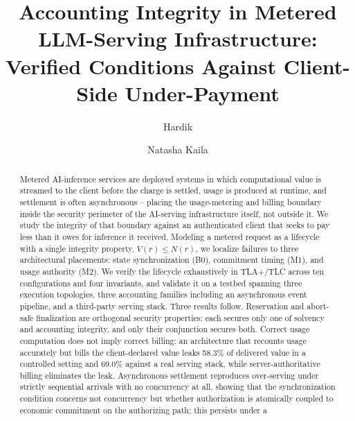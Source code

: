 \documentclass[manuscript,review]{acmart}
\begin{document}
\title{Accounting Integrity in Metered LLM-Serving Infrastructure:
Verified Conditions Against Client-Side Under-Payment}

\author{Hardik}

\author{Natasha Kaila}

\begin{abstract}
Metered AI-inference services are deployed systems in which computational value is
streamed to the client before the charge is settled, usage is produced at runtime, and
settlement is often asynchronous -- placing the usage-metering and billing boundary
inside the security perimeter of the AI-serving infrastructure itself, not outside it.
We study the integrity of that boundary against an authenticated client that seeks to
pay less than it owes for inference it received. Modeling a metered request as a
lifecycle with a single integrity property, $V(r) \le N(r)$, we localize failures to
three architectural placements: state synchronization (B0), commitment timing (M1), and
usage authority (M2). We verify the lifecycle exhaustively in TLA+/TLC across ten
configurations and four invariants, and validate it on a testbed spanning three
execution topologies, three accounting families including an asynchronous event
pipeline, and a third-party serving stack. Three results follow. Reservation and
abort-safe finalization are orthogonal security properties: each secures only one of
solvency and accounting integrity, and only their conjunction secures both. Correct
usage computation does not imply correct billing: an architecture that recounts usage
accurately but bills the client-declared value leaks 58.3\% of delivered value in a
controlled setting and 69.0\% against a real serving stack, while server-authoritative
billing eliminates the leak. Asynchronous settlement reproduces over-serving under
strictly sequential arrivals with no concurrency at all, showing that the
synchronization condition concerns not concurrency but whether authorization is
atomically coupled to economic commitment on the authorizing path; this persists under a

\end{abstract}
\end{document}
